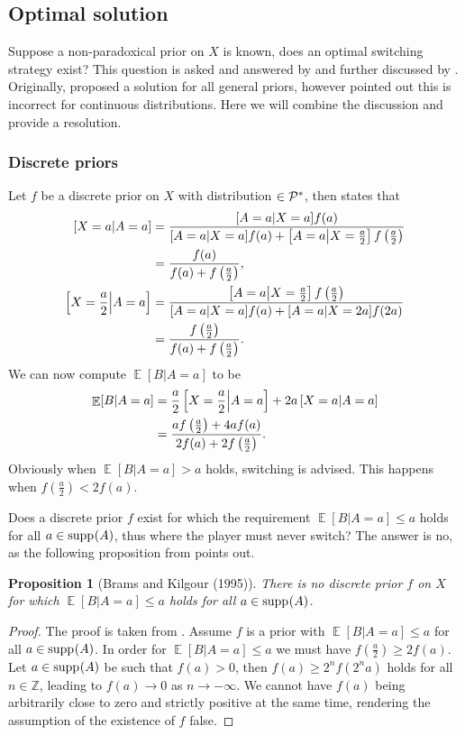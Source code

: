 \documentclass[a4paper]{report}
\theoremstyle{plain}
\newtheorem{proposition}[theorem]{Proposition}
\theoremstyle{definition}
\theoremstyle{remark}
\numberwithin{equation}{chapter}
\newcommand{\Z}{\mathbb{Z}}
\let\P\relax
\DeclareMathOperator{\P}{\mathbb{P}}
\DeclareMathOperator{\E}{\mathbb{E}}
\DeclareMathOperator{\1}{\mathbbm{1}}
\DeclareMathOperator{\supp}{supp}
\newcommand{\Pmod}{\mathcal{P}^*}
\begin{document}
\subsection{Optimal solution}
Suppose a non-paradoxical prior on $X$ is known, does an optimal switching strategy exist? This question is asked and answered by \cite{Christensen92} and further discussed by \cite{Christensen93a,Christensen93b,Christensen94,Christensen96}. Originally, \cite{Christensen92} proposed a solution for all general priors, however \cite{Christensen96} pointed out this is incorrect for continuous distributions. Here we will combine the discussion and provide a resolution.

\subsubsection{Discrete priors}
Let $f$ be a discrete prior on $X$ with distribution $\P\in\Pmod$, then \cite{Christensen92} states that
\begin{align}
\P\left[X=a\middle|A=a\right]&=\frac{\P[A=a|X=a]f(a)}{\P[A=a|X=a]f(a)+\P\left[A=a\middle|X=\frac{a}{2}\right]f\left(\frac{a}{2}\right)}\\
&=\frac{f(a)}{f(a)+f\left(\frac{a}{2}\right)},\\
\P\left[X=\frac{a}{2}\middle|A=a\right]&=\frac{\P\left[A=a\middle|X=\frac{a}{2}\right]f\left(\frac{a}{2}\right)}{\P[A=a|X=a]f(a)+\P[A=a|X=2a]f(2a)}\\
&=\frac{f\left(\frac{a}{2}\right)}{f(a)+f\left(\frac{a}{2}\right)}.
\end{align}
We can now compute $\E[B|A=a]$ to be
\begin{align}
\E[B|A=a]&=\frac{a}{2}\P\left[X=\frac{a}{2}\middle|A=a\right]+2a\P\left[X=a\middle|A=a\right]\\
&=\frac{af\left(\frac{a}{2}\right)+4af(a)}{2f(a)+2f\left(\frac{a}{2}\right)}.
\end{align}
Obviously when $\E[B|A=a]>a$ holds, switching is advised. This happens when $f\left(\frac{a}{2}\right)<2f(a)$.

Does a discrete prior $f$ exist for which the requirement $\E[B|A=a]\leq a$ holds for all $a\in\supp_{\P}(A)$, thus where the player must never switch? The answer is no, as the following proposition from \cite{Brams95} points out.
\begin{proposition}[Brams and Kilgour (1995)]
There is no discrete prior $f$ on $X$ for which $\E[B|A=a]\leq a$ holds for all $a\in\supp_{\P}(A)$.
\end{proposition}
\begin{proof}
The proof is taken from \cite{Brams95}. Assume $f$ is a prior with $\E[B|A=a]\leq a$ for all $a\in\supp_{\P}(A)$. In order for $\E[B|A=a]\leq a$ we must have $f\left(\frac{a}{2}\right)\geq2f(a)$. Let $a\in\supp_{\P}(A)$ be such that $f(a)>0$, then $f\left(a\right)\geq 2^{n}f(2^na)$ holds for all $n\in\Z$, leading to $f(a)\to0$ as $n\to-\infty$. We cannot have $f(a)$ being arbitrarily close to zero and strictly positive at the same time, rendering the assumption of the existence of $f$ false.
\end{proof}
\end{document}
